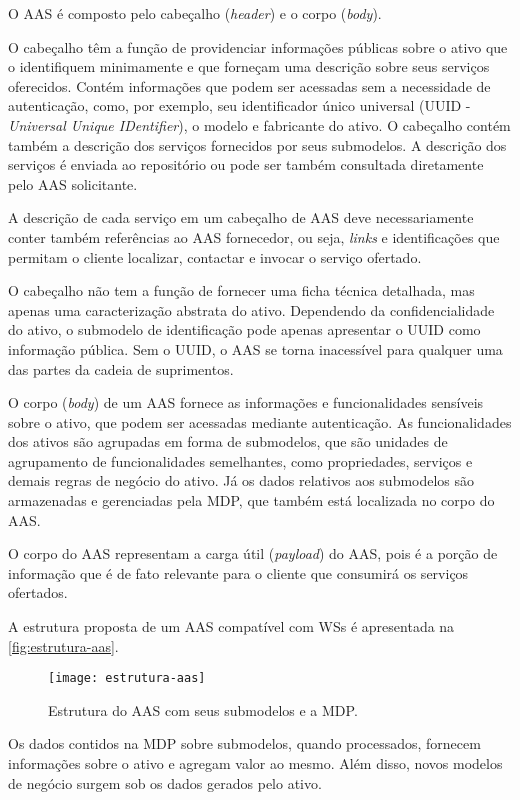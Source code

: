 	O AAS é composto pelo cabeçalho (\textit{header}) e o corpo (\textit{body}).
	
	O cabeçalho têm a função de providenciar informações públicas sobre o ativo que o identifiquem minimamente e que forneçam uma descrição sobre seus serviços oferecidos. Contém informações que podem ser acessadas sem a necessidade de autenticação, como, por exemplo, seu identificador único universal (UUID - \textit{Universal Unique IDentifier}), o modelo e fabricante do ativo. O cabeçalho contém também a descrição dos serviços fornecidos por seus submodelos. A descrição dos serviços é enviada ao repositório ou pode ser também consultada diretamente pelo AAS solicitante.
	
	A descrição de cada serviço em um cabeçalho de AAS deve necessariamente conter também referências ao AAS fornecedor, ou seja, \textit{links} e identificações que permitam o cliente localizar, contactar e invocar o serviço ofertado.
	
	O cabeçalho não tem a função de fornecer uma ficha técnica detalhada, mas apenas uma caracterização abstrata do ativo. Dependendo da confidencialidade do ativo, o submodelo de identificação pode apenas apresentar o UUID como informação pública. Sem o UUID, o AAS se torna inacessível para qualquer uma das partes da cadeia de suprimentos.
	
	O corpo (\textit{body}) de um AAS fornece as informações e funcionalidades sensíveis sobre o ativo, que podem ser acessadas mediante autenticação. As funcionalidades dos ativos são agrupadas em forma de submodelos, que são unidades de agrupamento de funcionalidades semelhantes, como propriedades, serviços e demais regras de negócio do ativo. Já os dados relativos aos submodelos são armazenadas e gerenciadas pela MDP, que também está localizada no corpo do AAS.
	
	O corpo do AAS representam a carga útil (\textit{payload}) do AAS, pois é a porção de informação que é de fato relevante para o cliente que consumirá os serviços ofertados.
	
	A estrutura proposta de um AAS compatível com WSs é apresentada na \autoref{fig:estrutura-aas}.
	
	\begin{figure}[htb]
		\centering
		\caption{Estrutura do AAS com seus submodelos e a MDP.}
		\label{fig:estrutura-aas}
		\texttt{[image: estrutura-aas]}
	\end{figure}

	Os dados contidos na MDP sobre submodelos, quando processados, fornecem informações sobre o ativo e agregam valor ao mesmo. Além disso, novos modelos de negócio surgem sob os dados gerados pelo ativo.
	
